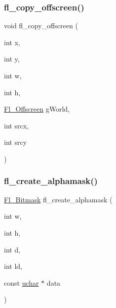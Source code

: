 \mbox{\label{mac_8_h_aa30661741226e267ecd17f3e6c1d9f61}} 
\subsubsection{\texorpdfstring{fl\+\_\+copy\+\_\+offscreen()}{fl\_copy\_offscreen()}}
{\footnotesize\ttfamily void fl\+\_\+copy\+\_\+offscreen (\begin{DoxyParamCaption}\item[{int}]{x,  }\item[{int}]{y,  }\item[{int}]{w,  }\item[{int}]{h,  }\item[{\hyperlink{mac_8_h_ad24d9679e17ea5ffa910ed355d4df340}{Fl\+\_\+\+Offscreen}}]{g\+World,  }\item[{int}]{srcx,  }\item[{int}]{srcy }\end{DoxyParamCaption})}

\mbox{\label{mac_8_h_af5567e13b18547cd9fb62385004e3d74}} 
\subsubsection{\texorpdfstring{fl\+\_\+create\+\_\+alphamask()}{fl\_create\_alphamask()}}
{\footnotesize\ttfamily \hyperlink{mac_8_h_a90133b6f8cfb11ab81d83b2c4d91310d}{Fl\+\_\+\+Bitmask} fl\+\_\+create\+\_\+alphamask (\begin{DoxyParamCaption}\item[{int}]{w,  }\item[{int}]{h,  }\item[{int}]{d,  }\item[{int}]{ld,  }\item[{const \hyperlink{fl__types_8h_a65f85814a8290f9797005d3b28e7e5fc}{uchar} $\ast$}]{data }\end{DoxyParamCaption})}

\mbox{\label{mac_8_h_a99e81bfdc18ac333efdc08ae52288020}} 
